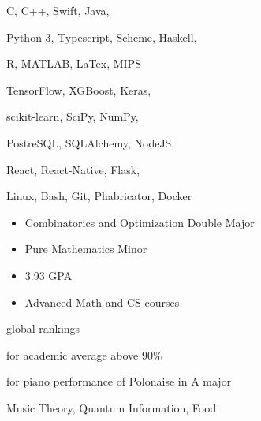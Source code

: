 C, C++, Swift, Java,
\smallskip

Python 3, Typescript, Scheme, Haskell,
\smallskip

R, MATLAB, LaTex, MIPS

\divider\smallskip

TensorFlow, XGBoost, Keras,
\smallskip

scikit-learn, SciPy, NumPy,
\smallskip

PostreSQL, SQLAlchemy, NodeJS,
\smallskip

React, React-Native, Flask,

\divider\smallskip

Linux, Bash, Git, Phabricator, Docker


\begin{itemize}
    \item Combinatorics and Optimization Double Major
    \item Pure Mathematics Minor
    \item 3.93 GPA
    \item Advanced Math and CS courses
\end{itemize}


global rankings

\divider\smallskip

for academic average above 90\%

\divider\smallskip

for piano performance of Polonaise in A major

\divider\smallskip


Music Theory, Quantum Information, Food
